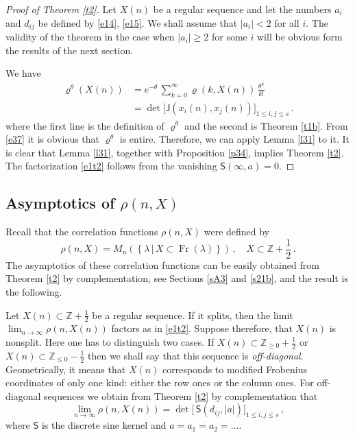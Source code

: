 \documentclass[12pt]{amsart}
\newcommand{\la}{\lambda}
\newcommand{\J}{\mathsf{J}}
\newcommand{\brh}{\boldsymbol{\varrho}}
\newcommand{\Z}{\mathbb{Z}}
\newcommand{\Fr}{\operatorname{Fr}}
\newcommand{\bS}{\mathsf{S}}
\newcommand{\sh}{{\textstyle \frac12}}
\newcommand{\ix}{\theta}
\theoremstyle{plain}
\theoremstyle{definition}
\numberwithin{equation}{section}
\begin{document}
\begin{proof}[Proof of Theorem \ref{t2}]
Let $X(n)$ be a regular sequence and let the numbers $a_i$ and
$d_{ij}$ be defined by \eqref{e14}, \eqref{e15}.  We shall assume that $|a_i|<2$ for
all $i$. The validity of the theorem in the case when $|a_i|\ge 2$ for some $i$
will be obvious form the results of the next section. 

We have
%
\begin{align}
\brh^\ix(X(n))&=e^{-\ix}\, \sum_{k=0}^\infty \brh(k,X(n))\, \frac{\ix^k}{k!}  \label{e37}\\
&=\det \Big[\J(x_i(n),x_j(n))\Big]_{1\le i,j \le s}\,.  \label{e38}
\end{align}
%
where the first line is the definition of $\brh^\ix$ and the second
is Theorem \ref{t1b}.  From \eqref{e37} it is obvious that $\brh^\ix$ is
entire. Therefore, we can apply Lemma \ref{l31} to it. It is
clear that Lemma \ref{l31}, together with Proposition \ref{p34}, implies
Theorem \ref{t2}. The factorization \eqref{e1t2} follows from 
the vanishing  $\bS(\infty,a)=0$. 
\end{proof}


\subsection{Asymptotics of $\rho(n,X)$}\label{s32}

Recall that the correlation functions $\rho(n,X)$ were
defined by
%
\begin{equation*}
\rho(n,X)= M_n\left(\left\{\la\,|\, X\subset \Fr(\la)\right\} 
\right)\,, \quad X\subset\Z+\sh\,. 
\end{equation*}
% 
The asymptotics of these correlation functions can be easily
obtained from Theorem \ref{t2} by complementation, see
Sections \ref{sA3} and \ref{s21b}, and the result is the 
following.

Let $X(n)\subset \Z+\sh$ be a regular sequence. If it
splits, then the limit $\lim_{n\to\infty} \rho(n,X(n))$ factors
as in \eqref{e1t2}. Suppose therefore, that $X(n)$
is nonsplit. Here one has to distinguish two cases.
If $X(n)\subset\Z_{\ge 0}+\sh$ or $X(n)\subset\Z_{\le 0}-\sh$
then we shall say that this sequence is \emph{off-diagonal}.
Geometrically, it means that $X(n)$ corresponds to
modified Frobenius coordinates of only one kind:
either the row ones or the column ones. For off-diagonal
sequences we obtain from Theorem \ref{t2} by complementation
that
%
\begin{equation*}
\lim_{n\to\infty} \rho\left(n,X(n)\right)
=
\det \Big[\,\bS(d_{ij},|a|)
\Big]_{1\le i,j \le s}\,,
\end{equation*}
%
where $\bS$ is the discrete sine kernel and $a=a_1=a_2=\dots$.
\end{document}
